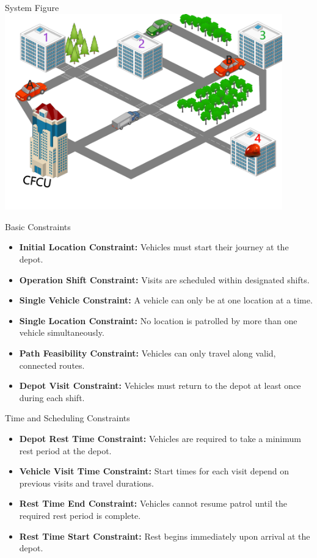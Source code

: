 \documentclass{beamer}
\begin{document}
\begin{frame}{System Figure}
  \centering
  \includegraphics[width=0.9\textwidth]{figs/P4O (1).png}
\end{frame}

\begin{frame}{Basic Constraints}
  \begin{itemize}
    \item \textbf{Initial Location Constraint:} Vehicles must start their journey at the depot.
    \pause
    \item \textbf{Operation Shift Constraint:} Visits are scheduled within designated shifts.
    \pause
    \item \textbf{Single Vehicle Constraint:} A vehicle can only be at one location at a time.
    \pause
    \item \textbf{Single Location Constraint:} No location is patrolled by more than one vehicle simultaneously.
    \pause
    \item \textbf{Path Feasibility Constraint:} Vehicles can only travel along valid, connected routes.
    \pause
    \item \textbf{Depot Visit Constraint:} Vehicles must return to the depot at least once during each shift.
  \end{itemize}
\end{frame}

\begin{frame}{Time and Scheduling Constraints}
  \begin{itemize}
    \item \textbf{Depot Rest Time Constraint:} Vehicles are required to take a minimum rest period at the depot.
    \pause
    \item \textbf{Vehicle Visit Time Constraint:} Start times for each visit depend on previous visits and travel durations.
    \pause
    \item \textbf{Rest Time End Constraint:} Vehicles cannot resume patrol until the required rest period is complete.
    \pause
    \item \textbf{Rest Time Start Constraint:} Rest begins immediately upon arrival at the depot.
  \end{itemize}
\end{frame}
\end{document}
